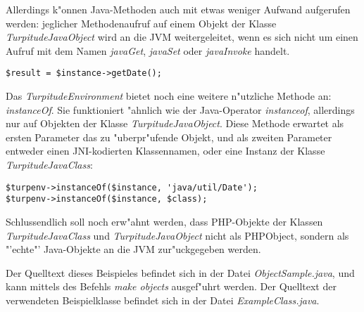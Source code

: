 Allerdings k"onnen Java-Methoden auch mit etwas weniger Aufwand aufgerufen werden:
jeglicher Methodenaufruf auf einem Objekt der Klasse \emph{TurpitudeJavaObject} wird an die
JVM weitergeleitet, wenn es sich nicht um einen Aufruf mit dem Namen \emph{javaGet}, \emph{javaSet}
oder \emph{javaInvoke} handelt.
\begin{lstlisting}[caption=direkter Methodenaufruf]
$result = $instance->getDate();
\end{lstlisting}
Das \emph{TurpitudeEnvironment} bietet noch eine weitere n"utzliche Methode an: \emph{instanceOf}.
Sie funktioniert "ahnlich wie der Java-Operator \emph{instanceof}, allerdings nur
auf Objekten der Klasse \emph{TurpitudeJavaObject}. Diese Methode erwartet als ersten Parameter
das zu "uberpr"ufende Objekt, und als zweiten Parameter entweder einen JNI-kodierten Klassennamen,
oder eine Instanz der Klasse \emph{TurpitudeJavaClass}:
\begin{lstlisting}[caption=instanceOf]
$turpenv->instanceOf($instance, 'java/util/Date');
$turpenv->instanceOf($instance, $class);
\end{lstlisting}
Schlussendlich soll noch erw"ahnt werden, dass PHP-Objekte der Klassen
\emph{TurpitudeJavaClass} und \emph{TurpitudeJavaObject} nicht als PHPObject, sondern als "'echte"'
Java-Objekte an die JVM zur"uckgegeben werden.

Der Quelltext dieses Beispieles befindet sich in der Datei \emph{ObjectSample.java}, 
und kann mittels des Befehls \emph{make objects} ausgef"uhrt werden. Der Quelltext der
verwendeten Beispielklasse befindet sich in der Datei \emph{ExampleClass.java}.

